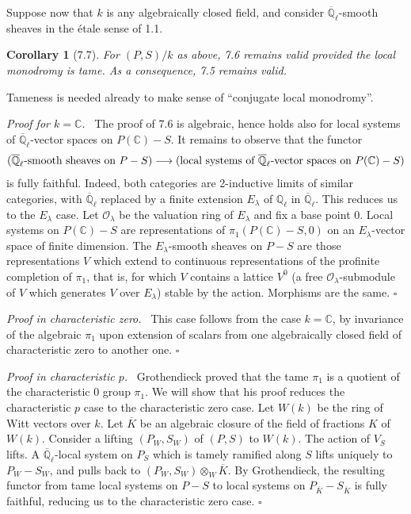 \documentclass[10pt]{article}
\newcommand{\Ql}{\overline{\mathbb Q}_{\ell}}
\newcommand{\C}{\mathbb C}
\newcommand{\Q}{\mathbb Q}
\newcommand{\OO}{\mathcal O}
\theoremstyle{deligne}
\newtheorem*{corollary*}{Corollary}
\newenvironment{proofdel}[1][Proof.]{\textit{#1}\ }{\hfill$\square$}
\begin{document}
Suppose now that $k$ is any algebraically closed field, and consider $\Ql$-smooth sheaves in the \'{e}tale sense of 1.1.

\begin{corollary*}[7.7]
For $(P,S)/k$ as above, 7.6 remains valid provided the local monodromy is tame. As a consequence, 7.5 remains valid.
\end{corollary*}

Tameness is needed already to make sense of ``conjugate local monodromy''.

\begin{proofdel}[Proof for $k=\C$.]
The proof of 7.6 is algebraic, hence holds also for local systems of $\Ql$-vector spaces on $P(\C)-S$. It remains to observe that the functor
\[
(\Ql\hbox{-smooth sheaves on }P-S)\longrightarrow
(\hbox{local systems of }\Ql\hbox{-vector spaces on }P(\C)-S)
\]
is fully faithful. Indeed, both categories are 2-inductive limits of similar categories, with $\Ql$ replaced by a finite extension $E_\lambda$ of $\Q_\ell$ in $\Ql$. This reduces us to the $E_\lambda$ case. Let $\OO_\lambda$ be the valuation ring of $E_\lambda$ and fix a base point $0$. Local systems on $P(\C)-S$ are representations of $\pi_1(P(\C)-S,0)$ on an $E_\lambda$-vector space of finite dimension. The $E_\lambda$-smooth sheaves on $P-S$ are those representations $V$ which extend to continuous representations of the profinite completion of $\pi_1$, that is, for which $V$ contains a lattice $V^0$ (a free $\OO_\lambda$-submodule of $V$ which generates $V$ over $E_\lambda$) stable by the action. Morphisms are the same.
\end{proofdel}

\begin{proofdel}[Proof in characteristic zero.]
This case follows from the case $k=\C$, by invariance of the algebraic $\pi_1$ upon extension of scalars from one algebraically closed field of characteristic zero to another one.
\end{proofdel}

\begin{proofdel}[Proof in characteristic $p$.]
Grothendieck proved that the tame $\pi_1$ is a quotient of the characteristic $0$ group $\pi_1$. We will show that his proof reduces the characteristic $p$ case to the characteristic zero case. Let $W(k)$ be the ring of Witt vectors over $k$. Let $\overline K$ be an algebraic closure of the field of fractions $K$ of $W(k)$. Consider a lifting $(P_W,S_W)$ of $(P,S)$ to $W(k)$. The action of $V_S$ lifts. A $\Ql$-local system on $P_S$ which is tamely ramified along $S$ lifts uniquely to $P_W-S_W$, and pulls back to $(P_W,S_W)\otimes_W\overline K$. By Grothendieck, the resulting functor from tame local systems on $P-S$ to local systems on $P_{\overline K}-S_{\overline K}$ is fully faithful, reducing us to the characteristic zero case.
\end{proofdel}
\end{document}
